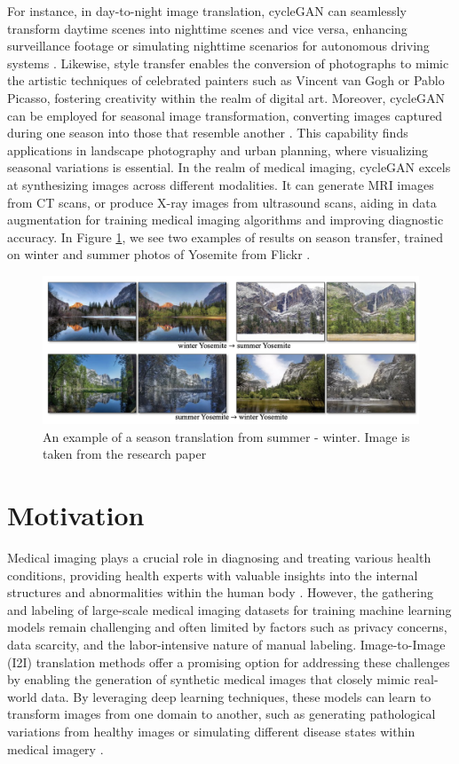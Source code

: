 \documentclass[UKenglish,12pt]{master-style}
\begin{document}
For instance, in day-to-night image translation, cycleGAN can seamlessly transform daytime scenes into nighttime scenes and vice versa, enhancing surveillance footage or simulating nighttime scenarios for autonomous driving systems \cite{satellite_image}. Likewise, style transfer enables the conversion of photographs to mimic the artistic techniques of celebrated painters such as Vincent van Gogh or Pablo Picasso, fostering creativity within the realm of digital art. Moreover, cycleGAN can be employed for seasonal image transformation, converting images captured during one season into those that resemble another \cite{style_transfer}. This capability finds applications in landscape photography and urban planning, where visualizing seasonal variations is essential. In the realm of medical imaging, cycleGAN excels at synthesizing images across different modalities. It can generate MRI images from CT scans, or produce X-ray images from ultrasound scans, aiding in data augmentation for training medical imaging algorithms and improving diagnostic accuracy. In Figure \ref{fig:winter_summer}, we see two examples of results on season transfer, trained on winter and summer photos of Yosemite from Flickr \cite{unpaired} .

\begin{figure}[ht]
    \centering
    \includegraphics[width=1\textwidth]{Images/winter_summer.png}
    \caption{An example of a season translation from summer - winter. Image is taken from the research paper \cite{unpaired}}
    \label{fig:winter_summer}
\end{figure}

\section{Motivation}

Medical imaging plays a crucial role in diagnosing and treating various health conditions, providing health experts with valuable insights into the internal structures and abnormalities within the human body \cite{medicalimage}. However, the gathering and labeling of large-scale medical imaging datasets for training machine learning models remain challenging and often limited by factors such as privacy concerns, data scarcity, and the labor-intensive nature of manual labeling. Image-to-Image (I2I) translation methods offer a promising option for addressing these challenges by enabling the generation of synthetic medical images that closely mimic real-world data. By leveraging deep learning techniques, these models can learn to transform images from one domain to another, such as generating pathological variations from healthy images or simulating different disease states within medical imagery \cite{I2I}.
\end{document}
